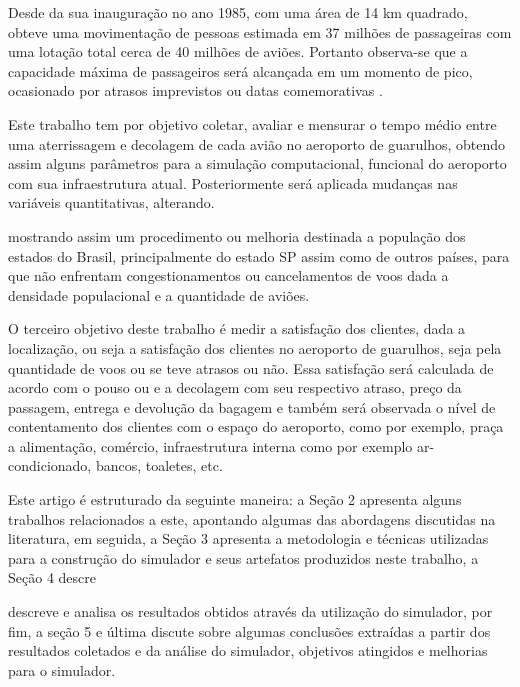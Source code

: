 \documentclass[12pt]{article}
\begin{document}
  Desde da sua inauguração no ano 1985, com uma área de 14 km quadrado,
  obteve uma movimentação de pessoas estimada em  37 milhões de passageiras
  com uma lotação total cerca de 40 milhões de aviões. Portanto observa-se
  que a capacidade máxima de passageiros será alcançada em um momento de
  pico, ocasionado por atrasos imprevistos ou datas comemorativas
  \cite{Moser:07}.
  



Este trabalho tem por objetivo coletar, avaliar e mensurar o tempo médio
entre uma aterrissagem e  decolagem de cada avião no aeroporto de guarulhos, obtendo assim alguns parâmetros para a simulação computacional, funcional do aeroporto com sua infraestrutura atual.
Posteriormente será  aplicada mudanças nas variáveis quantitativas, 
alterando.

mostrando assim um procedimento ou melhoria destinada  a população dos
estados do Brasil, principalmente do estado SP assim como de outros países,
para que não enfrentam congestionamentos ou cancelamentos de voos dada a 
densidade populacional e a quantidade de aviões.

O terceiro objetivo deste trabalho é medir a satisfação dos clientes, dada
a localização, ou seja a satisfação dos clientes no aeroporto de guarulhos, seja pela quantidade de voos ou se teve atrasos ou não.
Essa satisfação será calculada de acordo com o pouso ou e a decolagem com 
seu respectivo atraso, preço da passagem, entrega e devolução da bagagem
e também será observada o nível de contentamento dos clientes com o espaço
do aeroporto, como por exemplo, praça a alimentação, comércio, 
infraestrutura interna como por exemplo ar-condicionado, bancos, toaletes,
etc.


Este artigo é estruturado da seguinte maneira: a Seção 2 apresenta alguns trabalhos
relacionados a este, apontando algumas das abordagens discutidas na literatura,
em seguida, a Seção 3 apresenta a metodologia e técnicas utilizadas para a construção 
do simulador e seus artefatos produzidos neste trabalho, a Seção 4 descre


descreve e analisa 
os resultados obtidos através da utilização do simulador, por fim, a seção 5 e última 
discute sobre algumas conclusões extraídas a partir dos resultados coletados e da 
análise do simulador, objetivos atingidos e melhorias para o simulador.
  
\end{document}
